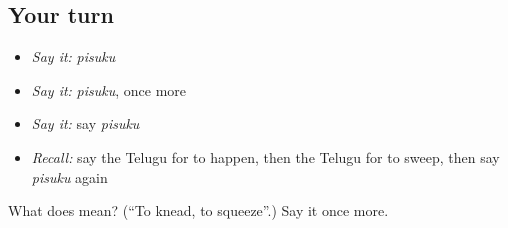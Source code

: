 \subsection*{Your turn}
\begin{itemize}
\raggedright
  \item \emph{Say it:} \emph{pisuku}
  \item \emph{Say it:} \emph{pisuku}, once more
  \item \emph{Say it:} say \emph{pisuku}
  \item \emph{Recall:} say the Telugu for to happen, then the Telugu for to sweep, then say \emph{pisuku} again
\end{itemize}

\begin{tcolorbox}[breakable,colback=teal!4,colframe=teal!35!black,title={Before you move on}]
What does  mean? (\textquotedblleft{}To knead, to squeeze\textquotedblright{}.) Say it once more.
\end{tcolorbox}
